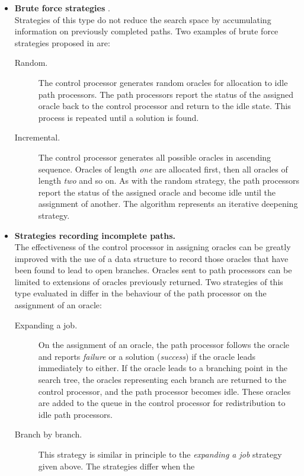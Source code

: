 \begin{itemize}
\item{\textbf{Brute force strategies} \cite{CA87}.\\
  Strategies of this type do not
  reduce the search space by accumulating information on previously
  completed paths.  Two examples of brute force strategies proposed in
  \cite{CA87} are:
  \begin{description}
  \item[Random.]{ The control processor generates random oracles for allocation
    to idle path processors.  The path processors report the status of the assigned
    oracle back to the control processor and return to the idle state.  This process
    is repeated until a solution is found.}
  \item[Incremental.]{ The control processor generates all possible oracles in
    ascending sequence.  Oracles of length \textit{one} are allocated first, then
    all oracles of length \textit{two} and so on.  As with the random strategy, the
    path processors report the status of the assigned oracle and become idle until the
    assignment of another.  The algorithm represents an iterative deepening strategy.}
  \end{description}
  }
\item{\textbf{Strategies recording incomplete paths.}\\
  The effectiveness of the control processor in assigning oracles can be greatly
  improved with the use of a data structure to record those oracles that have
  been found to lead to open branches.  Oracles sent
  to path processors can be limited to extensions of oracles previously returned.
  Two strategies of this type evaluated in \cite{Kle91} differ in the behaviour of
  the path processor on the assignment of an oracle:
  \begin{description}
  \item[Expanding a job.]{ On the assignment of an oracle, the path processor
    follows the oracle and reports \textit{failure} or a solution (\textit{success}) if
    the oracle leads immediately to either.
    If the oracle leads to a branching point in the search tree, the oracles
    representing each branch are returned to the control processor, and the path
    processor becomes idle.  These oracles are added to the queue in the control
    processor for redistribution to idle path processors.}
  \item[Branch by branch.]{ This strategy is similar in principle to the
    \textit{expanding a job} strategy given above.  The strategies differ when the
}
\end{description}}
\end{itemize}
